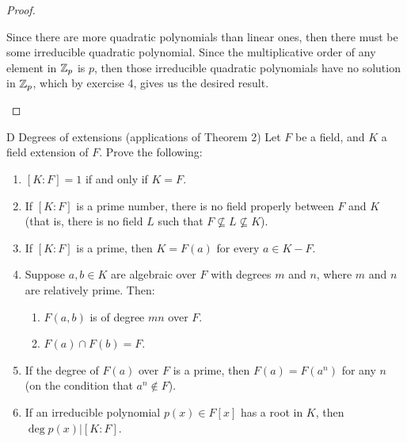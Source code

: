 \begin{proof}
\begin{enumerate}
    Since there are more quadratic polynomials than linear ones, then there must be some irreducible quadratic polynomial. Since the multiplicative order of any element in $\mathbb{Z}_p$ is $p$, then those irreducible quadratic polynomials have no solution in $\mathbb{Z}_p$, which by exercise 4, gives us the desired result.
 \end{enumerate}
\end{proof}

\begin{exercise}{D Degrees of extensions (applications of Theorem 2)}
Let $F$ be a field, and $K$ a field extension of $F$. Prove the following:
\begin{enumerate}
    \item $[K:F]=1$ if and only if $K=F$.
    \item If $[K:F]$ is a prime number, there is no field properly between $F$ and $K$ (that is, there is no field $L$ such that $F\not\subseteq L\not\subseteq K$).
    \item If $[K:F]$ is a prime, then $K=F(a)$ for every $a\in K-F$.
    \item Suppose $a,b\in K$ are algebraic over $F$ with degrees $m$ and $n$, where $m$ and $n$ are relatively prime. Then:
    \begin{enumerate}
        \item $F(a,b)$ is of degree $mn$ over $F$.
        \item $F(a)\cap F(b)=F$.
    \end{enumerate}
    \item If the degree of $F(a)$ over $F$ is a prime, then $F(a)=F(a^n)$ for any $n$ (on the condition that $a^n\notin F$).
    \item If an irreducible polynomial $p(x)\in F[x]$ has a root in $K$, then $\deg p(x)\vert[K:F]$.
\end{enumerate}
\end{exercise}
